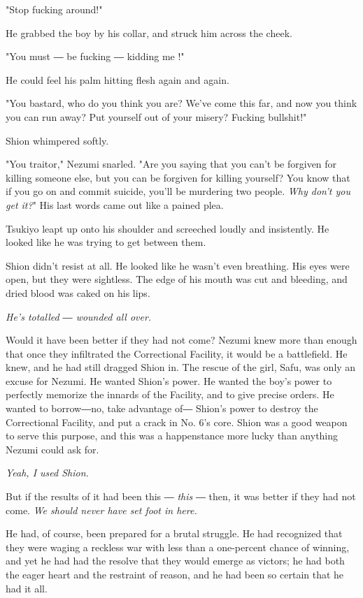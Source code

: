 "Stop fucking around!"

He grabbed the boy by his collar, and struck him across the cheek.

"You must ― be fucking ― kidding me !"

He could feel his palm hitting flesh again and again.

"You bastard, who do you think you are? We've come this far, and now you
think you can run away? Put yourself out of your misery? Fucking
bullshit!"

Shion whimpered softly.

"You traitor," Nezumi snarled. "Are you saying that you can't be
forgiven for killing someone else, but you can be forgiven for killing
yourself? You know that if you go on and commit suicide, you'll be
murdering two people. \emph{Why don't you get it?}" His last words came out
like a pained plea.

Tsukiyo leapt up onto his shoulder and screeched loudly and insistently.
He looked like he was trying to get between them.

Shion didn't resist at all. He looked like he wasn't even breathing. His
eyes were open, but they were sightless. The edge of his mouth was cut
and bleeding, and dried blood was caked on his lips.

\emph{He's totalled ― wounded all over.}

Would it have been better if they had not come? Nezumi knew more than
enough that once they infiltrated the Correctional Facility, it would be
a battlefield. He knew, and he had still dragged Shion in. The rescue of
the girl, Safu, was only an excuse for Nezumi. He wanted Shion's power.
He wanted the boy's power to perfectly memorize the innards of the
Facility, and to give precise orders. He wanted to borrow―no, take
advantage of― Shion's power to destroy the Correctional Facility, and
put a crack in No. 6's core. Shion was a good weapon to serve this
purpose, and this was a happenstance more lucky than anything Nezumi
could ask for.

\emph{Yeah, I used Shion.}

But if the results of it had been this ― \emph{this} ― then, it was better if
they had not come. \emph{We should never have set foot in here.}

He had, of course, been prepared for a brutal struggle. He had
recognized that they were waging a reckless war with less than a
one-percent chance of winning, and yet he had had the resolve that they
would emerge as victors; he had both the eager heart and the restraint
of reason, and he had been so certain that he had it all.

